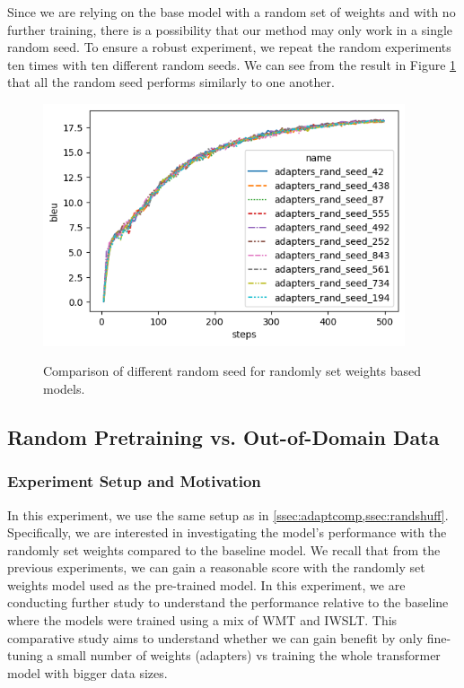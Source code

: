Since we are relying on the base model with a random set of weights and with no further training, there is a possibility that our method may only work in a single random seed. To ensure a robust experiment, we repeat the random experiments ten times with ten different random seeds. We can see from the result in Figure \ref{img:rndmseed} that all the random seed performs similarly to one another.

\begin{figure}[h]
    {\includegraphics[width=0.95\textwidth]{img/adapter_random_multiseed.png}}
    \centering
    \caption{Comparison of different random seed for randomly set weights based models.}
    \label{img:rndmseed}
\end{figure}

\subsection{Random Pretraining vs. Out-of-Domain Data}
\label{ssec:randpre}
\subsubsection{Experiment Setup and Motivation}
In this experiment, we use the same setup as in \cref{ssec:adaptcomp,ssec:randshuff}. Specifically, we are interested in investigating the model's performance with the randomly set weights compared to the baseline model. We recall that from the previous experiments, we can gain a reasonable score with the randomly set weights model used as the pre-trained model. In this experiment, we are conducting further study to understand the performance relative to the baseline where the models were trained using a mix of WMT and IWSLT. This comparative study aims to understand whether we can gain benefit by only fine-tuning a small number of weights (adapters) vs training the whole transformer model with bigger data sizes.


